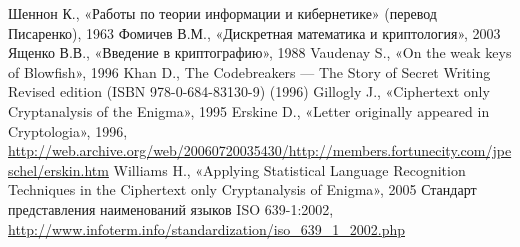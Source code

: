 \begin{thebibliography}{1}
 Шеннон К., «Работы по теории информации и кибернетике» (перевод Писаренко), 1963
 Фомичев В.М., «Дискретная математика и криптология», 2003
 Ященко В.В., «Введение в криптографию», 1988
 Vaudenay S., «On the weak keys of Blowfish», 1996
 Khan D., The Codebreakers --- The Story of Secret Writing Revised edition (ISBN 978-0-684-83130-9) (1996)
 Gillogly J., «Ciphertext only Cryptanalysis of the Enigma», 1995
 Erskine D., «Letter originally appeared in Cryptologia», 1996, \url{http://web.archive.org/web/20060720035430/http://members.fortunecity.com/jpeschel/erskin.htm}
 Williams H., «Applying Statistical Language Recognition Techniques in the Ciphertext only Cryptanalysis of Enigma», 2005
 Стандарт представления наименований языков ISO 639-1:2002, \url{http://www.infoterm.info/standardization/iso_639_1_2002.php}
\end{thebibliography}
